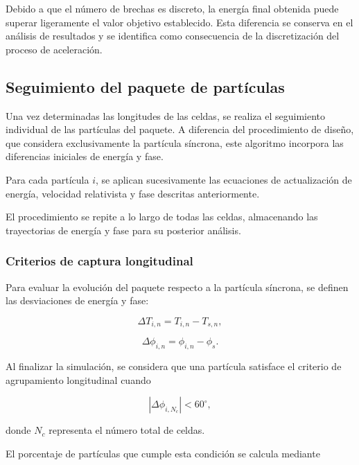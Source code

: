Debido a que el número de brechas es discreto, la energía final obtenida puede superar ligeramente el valor objetivo establecido. Esta diferencia se conserva en el análisis de resultados y se identifica como consecuencia de la discretización del proceso de aceleración.

\subsection{Seguimiento del paquete de partículas}

Una vez determinadas las longitudes de las celdas, se realiza el seguimiento individual de las partículas del paquete. A diferencia del procedimiento de diseño, que considera exclusivamente la partícula síncrona, este algoritmo incorpora las diferencias iniciales de energía y fase.

Para cada partícula $i$, se aplican sucesivamente las ecuaciones de actualización de energía, velocidad relativista y fase descritas anteriormente.

El procedimiento se repite a lo largo de todas las celdas, almacenando las trayectorias de energía y fase para su posterior análisis.

\subsubsection*{Criterios de captura longitudinal}

Para evaluar la evolución del paquete respecto a la partícula síncrona, se definen las desviaciones de energía y fase:

\begin{equation}
    \Delta T_{i,n}
    =
    T_{i,n}-T_{s,n},
\end{equation}

\begin{equation}
    \Delta\phi_{i,n}
    =
    \phi_{i,n}-\phi_s.
\end{equation}

Al finalizar la simulación, se considera que una partícula satisface el criterio de agrupamiento longitudinal cuando

\begin{equation}
    |\Delta\phi_{i,N_c}|<60^\circ,
\end{equation}

donde $N_c$ representa el número total de celdas.

El porcentaje de partículas que cumple esta condición se calcula mediante

